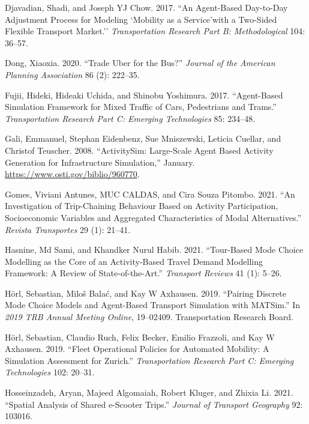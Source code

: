 \documentclass[12pt, oneside, openright]{byuthesis}
\newlength{\cslhangindent}
\newlength{\cslentryspacingunit} %
\newenvironment{CSLReferences}[2] %
 {%
  \setlength{\parindent}{0pt}
  \ifodd #1
  \let\oldpar\par
  \def\par{\hangindent=\cslhangindent\oldpar}
  \fi
  \setlength{\parskip}{#2\cslentryspacingunit}
 }%
 {}
\begin{document}
\begin{CSLReferences}{1}{0}
\leavevmode{}%
Djavadian, Shadi, and Joseph YJ Chow. 2017. {``An Agent-Based Day-to-Day Adjustment Process for Modeling `Mobility as a Service'with a Two-Sided Flexible Transport Market.''} \emph{Transportation Research Part B: Methodological} 104: 36--57.

\leavevmode{}%
Dong, Xiaoxia. 2020. {``Trade Uber for the Bus?''} \emph{Journal of the American Planning Association} 86 (2): 222--35.

\leavevmode{}%
Fujii, Hideki, Hideaki Uchida, and Shinobu Yoshimura. 2017. {``Agent-Based Simulation Framework for Mixed Traffic of Cars, Pedestrians and Trams.''} \emph{Transportation Research Part C: Emerging Technologies} 85: 234--48.

\leavevmode{}%
Gali, Emmanuel, Stephan Eidenbenz, Sue Mniszewski, Leticia Cuellar, and Christof Teuscher. 2008. {``ActivitySim: Large-Scale Agent Based Activity Generation for Infrastructure Simulation,''} January. \url{https://www.osti.gov/biblio/960770}.

\leavevmode{}%
Gomes, Viviani Antunes, MUC CALDAS, and Cira Souza Pitombo. 2021. {``An Investigation of Trip-Chaining Behaviour Based on Activity Participation, Socioeconomic Variables and Aggregated Characteristics of Modal Alternatives.''} \emph{Revista Transportes} 29 (1): 21--41.

\leavevmode{}%
Hasnine, Md Sami, and Khandker Nurul Habib. 2021. {``Tour-Based Mode Choice Modelling as the Core of an Activity-Based Travel Demand Modelling Framework: A Review of State-of-the-Art.''} \emph{Transport Reviews} 41 (1): 5--26.

\leavevmode{}%
Hörl, Sebastian, Miloš Balać, and Kay W Axhausen. 2019. {``Pairing Discrete Mode Choice Models and Agent-Based Transport Simulation with MATSim.''} In \emph{2019 TRB Annual Meeting Online}, 19--02409. Transportation Research Board.

\leavevmode{}%
Hörl, Sebastian, Claudio Ruch, Felix Becker, Emilio Frazzoli, and Kay W Axhausen. 2019. {``Fleet Operational Policies for Automated Mobility: A Simulation Assessment for Zurich.''} \emph{Transportation Research Part C: Emerging Technologies} 102: 20--31.

\leavevmode{}%
Hosseinzadeh, Aryan, Majeed Algomaiah, Robert Kluger, and Zhixia Li. 2021. {``Spatial Analysis of Shared e-Scooter Trips.''} \emph{Journal of Transport Geography} 92: 103016.


\end{CSLReferences}
\end{document}
